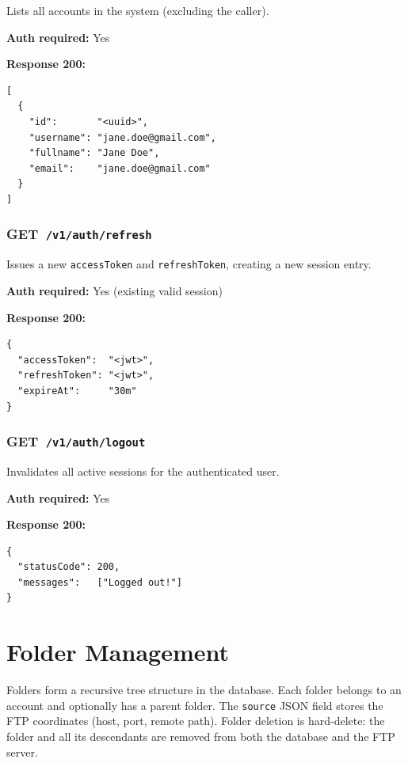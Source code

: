 \documentclass[12pt,a4paper]{article}
\newcommand{\httpget}[1]{%
  \colorbox{getcolor!20}{\textcolor{getcolor}{\textbf{\small GET}}}~\texttt{#1}%
}
\begin{document}
Lists all accounts in the system (excluding the caller).

\textbf{Auth required:} Yes

\textbf{Response 200:}
\begin{lstlisting}
[
  {
    "id":       "<uuid>",
    "username": "jane.doe@gmail.com",
    "fullname": "Jane Doe",
    "email":    "jane.doe@gmail.com"
  }
]
\end{lstlisting}

\vspace{0.5em}
\subsubsection{\httpget{/v1/auth/refresh}}

Issues a new \texttt{accessToken} and \texttt{refreshToken}, creating a new session entry.

\textbf{Auth required:} Yes (existing valid session)

\textbf{Response 200:}
\begin{lstlisting}
{
  "accessToken":  "<jwt>",
  "refreshToken": "<jwt>",
  "expireAt":     "30m"
}
\end{lstlisting}

\vspace{0.5em}
\subsubsection{\httpget{/v1/auth/logout}}

Invalidates all active sessions for the authenticated user.

\textbf{Auth required:} Yes

\textbf{Response 200:}
\begin{lstlisting}
{
  "statusCode": 200,
  "messages":   ["Logged out!"]
}
\end{lstlisting}

\newpage

\section{Folder Management}

Folders form a recursive tree structure in the database. Each folder belongs to an account and optionally has a parent folder. The \texttt{source} JSON field stores the FTP coordinates (host, port, remote path). Folder deletion is hard-delete: the folder and all its descendants are removed from both the database and the FTP server.
\end{document}
